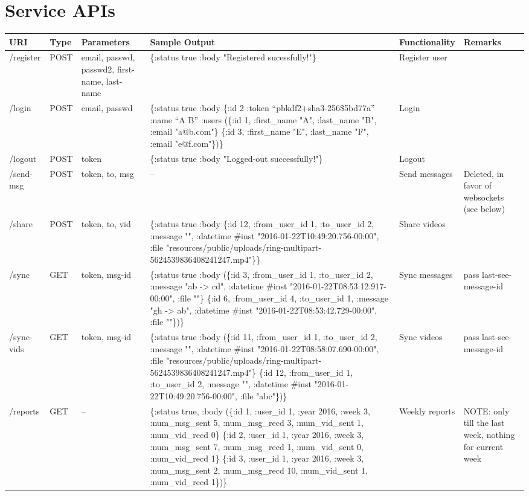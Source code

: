 \documentclass[a4paper, 10pt]{article}
\begin{document}
\section{Service APIs}
\begin{tabular}[]{|l|l|p{2cm}|p{5cm}|p{2.1cm}|p{2cm}|}
  \hline
  URI & Type & Parameters & Sample Output & Functionality & Remarks \\ \hline
  /register & POST & email, passwd, passwd2, first-name, last-name & \{:status true :body "Registered sucessfully!"\} & Register user & \\ \hline
  /login & POST & email, passwd & \{:status true :body \{:id 2 :token ``pbkdf2+sha3-256\$5bd77a'' :name ``A B'' :users (\{:id 1, :first\_name "A", :last\_name "B", :email "a@b.com"\} \{:id 3, :first\_name "E", :last\_name "F", :email "e@f.com"\})\} & Login & \\ \hline
  /logout & POST & token & \{:status true :body "Logged-out successfully!"\} & Logout & \\ \hline
  /send-msg & POST & token, to, msg & -- & Send messages & Deleted, in favor of websockets (see below) \\ \hline
  /share & POST & token, to, vid & \{:status true :body \{:id 12, :from\_user\_id 1, :to\_user\_id 2, :message "", :datetime \#inst "2016-01-22T10:49:20.756-00:00", :file "resources/public/uploads/ring-multipart-5624539836408241247.mp4"\}\} & Share videos & \\ \hline
  /sync & GET & token, msg-id & \{:status true :body (\{:id 3, :from\_user\_id 1, :to\_user\_id 2, :message "ab -> cd", :datetime \#inst "2016-01-22T08:53:12.917-00:00", :file ""\} \{:id 6, :from\_user\_id 4, :to\_user\_id 1, :message "gh -> ab", :datetime \#inst "2016-01-22T08:53:42.729-00:00", :file ""\})\} & Sync messages & pass last-see-message-id \\ \hline
  /sync-vids & GET & token, msg-id & \{:status true :body (\{:id 11, :from\_user\_id 1, :to\_user\_id 2, :message "", :datetime \#inst "2016-01-22T08:58:07.690-00:00", :file "resources/public/uploads/ring-multipart-5624539836408241247.mp4"\} \{:id 12, :from\_user\_id 1, :to\_user\_id 2, :message "", :datetime \#inst "2016-01-22T10:49:20.756-00:00", :file "abc"\})\} & Sync videos & pass last-see-message-id \\ \hline
  /reports & GET & -- & \{:status true, :body (\{:id 1, :user\_id 1, :year 2016, :week 3, :num\_msg\_sent 5, :num\_msg\_recd 3, :num\_vid\_sent 1, :num\_vid\_recd 0\} \{:id 2, :user\_id 1, :year 2016, :week 3, :num\_msg\_sent 7, :num\_msg\_recd 1, :num\_vid\_sent 0, :num\_vid\_recd 1\} \{:id 3, :user\_id 1, :year 2016, :week 3, :num\_msg\_sent 2, :num\_msg\_recd 10, :num\_vid\_sent 1, :num\_vid\_recd 1\})\} & Weekly reports & NOTE: only till the last week, nothing for current week \\ \hline
\end{tabular}
\end{document}
